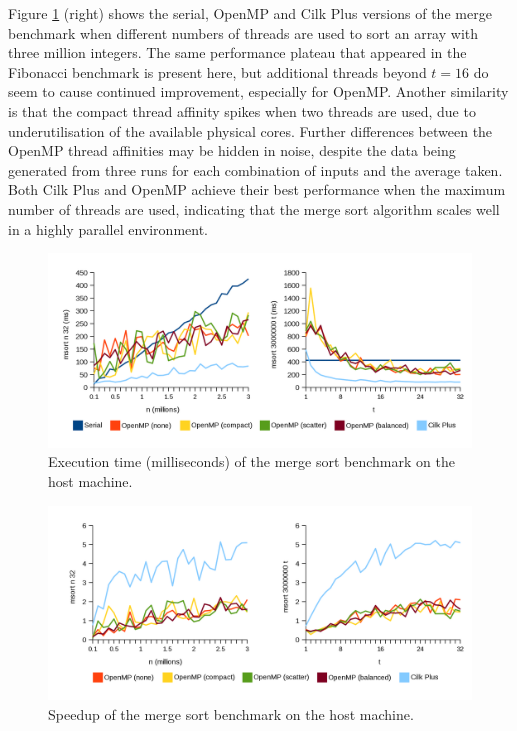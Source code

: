 \documentclass{report}
\begin{document}
Figure \ref{Fig:msorthosttime} (right) shows the serial, OpenMP and Cilk Plus versions of the merge benchmark when different numbers of threads are used to sort an array with three million integers. The same performance plateau that appeared in the Fibonacci benchmark is present here, but additional threads beyond \(t=16\) do seem to cause continued improvement, especially for OpenMP. Another similarity is that the compact thread affinity spikes when two threads are used, due to underutilisation of the available physical cores. Further differences between the OpenMP thread affinities may be hidden in noise, despite the data being generated from three runs for each combination of inputs and the average taken. Both Cilk Plus and OpenMP achieve their best performance when the maximum number of threads are used, indicating that the merge sort algorithm scales well in a highly parallel environment.
\noindent
\begin{figure}[t!]
	\includegraphics[width=\linewidth]{../../charts/intel64/msort_time}
	\caption{Execution time (milliseconds) of the merge sort benchmark on the host machine.}
	\label{Fig:msorthosttime}
\end{figure}
\noindent
\begin{figure}[t!]
	\includegraphics[width=\linewidth]{../../charts/intel64/msort_speedup}
	\caption{Speedup of the merge sort benchmark on the host machine.}
	\label{Fig:msorthostspeedup}
\end{figure}
\end{document}
